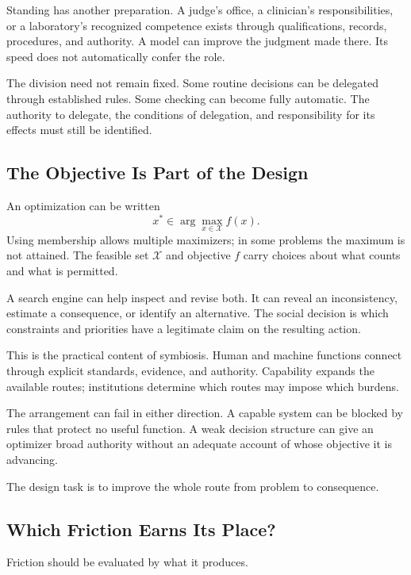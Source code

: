 \documentclass[11pt,openany]{book}
\begin{document}
Standing has another preparation. A judge's office, a clinician's responsibilities, or a laboratory's recognized competence exists through qualifications, records, procedures, and authority. A model can improve the judgment made there. Its speed does not automatically confer the role.

The division need not remain fixed. Some routine decisions can be delegated through established rules. Some checking can become fully automatic. The authority to delegate, the conditions of delegation, and responsibility for its effects must still be identified.

\subsection{The Objective Is Part of the Design}

An optimization can be written
\begin{equation}
 x^\ast\in\arg\max_{x\in\mathcal X} f(x).
\end{equation}
Using membership allows multiple maximizers; in some problems the maximum is not attained. The feasible set $\mathcal X$ and objective $f$ carry choices about what counts and what is permitted.

A search engine can help inspect and revise both. It can reveal an inconsistency, estimate a consequence, or identify an alternative. The social decision is which constraints and priorities have a legitimate claim on the resulting action.

This is the practical content of symbiosis. Human and machine functions connect through explicit standards, evidence, and authority. Capability expands the available routes; institutions determine which routes may impose which burdens.

The arrangement can fail in either direction. A capable system can be blocked by rules that protect no useful function. A weak decision structure can give an optimizer broad authority without an adequate account of whose objective it is advancing.

The design task is to improve the whole route from problem to consequence.

\subsection{Which Friction Earns Its Place?}

Friction should be evaluated by what it produces.
\end{document}
